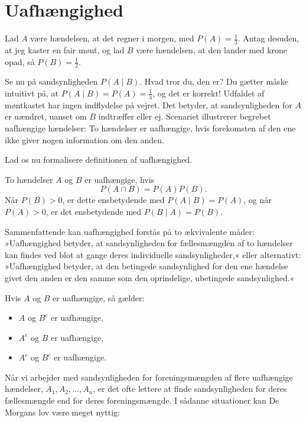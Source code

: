 \section{Uafhængighed}
Lad $A$ være hændelsen, at det regner i morgen, med $P(A)=\frac{1}{3}$. Antag desuden, at jeg kaster en fair mønt, og lad $B$ være hændelsen, at den lander med krone opad, så $P(B)=\frac{1}{2}$.

Se nu på sandsynligheden $P(A \mid B)$. Hvad tror du, den er? Du gætter måske intuitivt på, at $P(A \mid B)=P(A)=\frac{1}{3}$, og det er korrekt! Udfaldet af møntkastet har ingen indflydelse på vejret. Det betyder, at sandsynligheden for $A$ er uændret, uanset om $B$ indtræffer eller ej. Scenariet illustrerer begrebet uafhængige hændelser: To hændelser er uafhængige, hvis forekomsten af den ene ikke giver nogen information om den anden.

Lad os nu formalisere definitionen af uafhængighed.

\begin{definition}[Uafhængighed]
    To hændelser \( A \) og \( B \) er uafhængige, hvis
    \[
        P(A \cap B)=P(A)P(B).
    \]
    Når \(P(B)>0\), er dette ensbetydende med \(P(A\mid B)=P(A)\), og når \(P(A)>0\), er det ensbetydende med \(P(B\mid A)=P(B)\).
\end{definition}

Sammenfattende kan uafhængighed forstås på to ækvivalente måder: »Uafhængighed betyder, at sandsynligheden for fællesmængden af to hændelser kan findes ved blot at gange deres individuelle sandsynligheder,« eller alternativt: »Uafhængighed betyder, at den betingede sandsynlighed for den ene hændelse givet den anden er den samme som den oprindelige, ubetingede sandsynlighed.«

\begin{lemma}
Hvis $A$ og $B$ er uafhængige, så gælder:
\begin{itemize}
    \item $A$ og $B^c$ er uafhængige,
    \item $A^c$ og $B$ er uafhængige,
    \item $A^c$ og $B^c$ er uafhængige.
\end{itemize}
\end{lemma}

Når vi arbejder med sandsynligheden for foreningsmængden af flere uafhængige hændelser, \( A_1, A_2, \ldots, A_n \), er det ofte lettere at finde sandsynligheden for deres fællesmængde end for deres foreningsmængde. I sådanne situationer kan De Morgans lov være meget nyttig:


